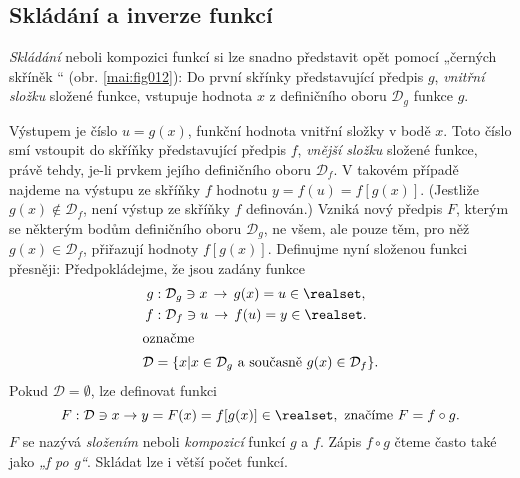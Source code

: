     \subsection{Skládání a inverze funkcí}\label{mai:IchapIIIsecIssecV}
      \emph{Skládání} neboli kompozici funkcí si lze snadno představit opět pomocí „černých skříněk
      “ (obr. \ref{mai:fig012}): Do první skřínky představující předpis \(g\), \emph{vnitřní složku}
      složené funkce, vstupuje hodnota \(x\) z definičního oboru \(\mathcal{D}_g\) funkce \(g\).


      Výstupem je číslo \(u = g(x)\), funkční hodnota vnitřní složky v bodě \(x\). Toto číslo smí
      vstoupit do skříňky představující předpis \(f\), \emph{vnější složku} složené funkce, právě
      tehdy, je-li prvkem jejího definičního oboru \(\mathcal{D}_f\). V takovém případě najdeme na
      výstupu ze skříňky \(f\) hodnotu \(y = f(u) = f[g(x)]\). (Jestliže
      \(g(x)\notin\mathcal{D}_f\), není výstup ze skříňky \(f\) definován.) Vzniká nový předpis
      \(F\), kterým se některým bodům definičního oboru \(\mathcal{D}_g\), ne všem, ale pouze těm,
      pro něž \(g(x)\in\mathcal{D}_f\), přiřazují hodnoty \(f[g(x)]\). Definujme nyní složenou
      funkci přesněji: Předpokládejme, že jsou zadány funkce
      \begin{align*}
        g  &: \mathcal{D}_g\ni x\,\rightarrow\, g(x) = u\in\realset, \\
        f  &: \mathcal{D}_f\ni u\,\rightarrow\, f(u) = y\in\realset. \\
        \shortintertext{označme}
        \mathcal{D} &= \{x\lvert x\in\mathcal{D}_g \text{ a současně } g(x)\in\mathcal{D}_f\}.
      \end{align*}
      Pokud \(\mathcal{D} = \emptyset\), lze definovat funkci
      \begin{equation*}
        F: \mathcal{D}\ni x\rightarrow y = F(x) = f[g(x)]\in\realset, 
           \text{ značíme } F = f \circ g.
      \end{equation*}
      \(F\) se nazývá \emph{složením} neboli \emph{kompozicí} funkcí \(g\) a \(f\). Zápis \(f\circ 
      g\) čteme často také jako \emph{„f po g“}. Skládat lze i větší počet funkcí.

         
      
